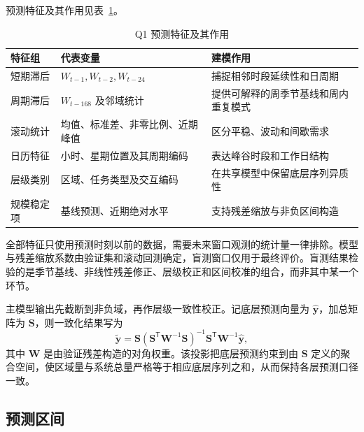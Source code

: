 预测特征及其作用见表~\ref{tab:q1-features}。

\begin{table}[H]
  \centering
  \caption{Q1 预测特征及其作用}
  \label{tab:q1-features}
  \small
  \begin{tabularx}{\textwidth}{p{}p{}X}
    \toprule
    特征组 & 代表变量 & 建模作用 \\
    \midrule
    短期滞后 & $W_{t-1},W_{t-2},W_{t-24}$ & 捕捉相邻时段延续性和日周期 \\
    周期滞后 & $W_{t-168}$ 及邻域统计 & 提供可解释的周季节基线和周内重复模式 \\
    滚动统计 & 均值、标准差、非零比例、近期峰值 & 区分平稳、波动和间歇需求 \\
    日历特征 & 小时、星期位置及其周期编码 & 表达峰谷时段和工作日结构 \\
    层级类别 & 区域、任务类型及交互编码 & 在共享模型中保留底层序列异质性 \\
    规模稳定项 & 基线预测、近期绝对水平 & 支持残差缩放与非负区间构造 \\
    \bottomrule
  \end{tabularx}
\end{table}

全部特征只使用预测时刻以前的数据，需要未来窗口观测的统计量一律排除。模型与残差缩放系数由验证集和滚动回测确定，盲测窗口仅用于最终评价。盲测结果检验的是季节基线、非线性残差修正、层级校正和区间校准的组合，而非其中某一个环节。

主模型输出先截断到非负域，再作层级一致性校正。记底层预测向量为 $\hat{\boldsymbol y}$，加总矩阵为 $\boldsymbol S$，则一致化结果写为
\begin{equation}
  \tilde{\boldsymbol y}=\boldsymbol S
  \left(\boldsymbol S^{\mathsf T}\boldsymbol W^{-1}\boldsymbol S\right)^{-1}
  \boldsymbol S^{\mathsf T}\boldsymbol W^{-1}\hat{\boldsymbol y},
  \label{eq:reconciliation}
\end{equation}
其中 $\boldsymbol W$ 是由验证残差构造的对角权重。该投影把底层预测约束到由 $\boldsymbol S$ 定义的聚合空间，使区域量与系统总量严格等于相应底层序列之和，从而保持各层预测口径一致。

\subsection{预测区间}

